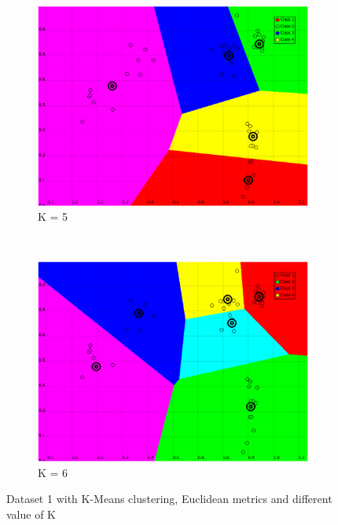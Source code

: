 \documentclass[a4paper,10pt]{article}
\begin{document}
\begin{figure}[H]
\begin{subfigure}[t]{0.2\textwidth}
      \centering
      \includegraphics[width=\textwidth]{pictures/dataset_1_Kmeans-L2-5K}
      \caption{K = 5}
      \label{fig:dataset_1_Kmeans-L2-5K}
     \end{subfigure}
      ~
    \begin{subfigure}[t]{0.2\textwidth}
      \centering
      \includegraphics[width=\textwidth]{pictures/dataset_1_Kmeans-L2-6K}
      \caption{K = 6}
      \label{fig:dataset_1_Kmeans-L2-6K}
     \end{subfigure}
     \caption{Dataset 1 with K-Means clustering, Euclidean metrics and different value of K}
     \label{fig:kmeans_differentK}
\end{figure}
\end{document}
